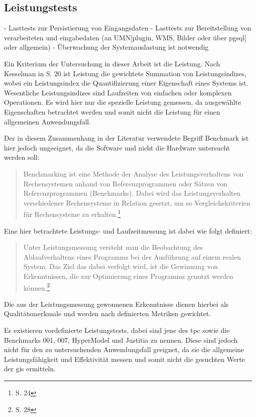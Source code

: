 \subsection{Leistungstests}
\label{Leistungstests}

- Lasttests zur Persistierung von Eingangsdaten
- Lasttests zur Bereitstellung von verarbeiteten und eingabedaten (an UMN[plugin, WMS, Bilder oder über pgsql] oder allgemein)
- Überwachung der Systemauslastung ist notwendig

Ein Kriterium der Untersuchung in dieser Arbeit ist die Leistung.
Nach Kesselman in \cite{book:Leistungsanalyse} S. 20 ist Leistung die gewichtete Summation von Leistungsindizes, wobei ein Leistungsindex die Quantifizierung einer Eigenschaft eines Systems ist.
Wesentliche Leistungsindizes sind Laufzeiten von einfachen oder komplexen Operationen.
Es wird hier nur die spezielle Leistung gemessen, da ausgewählte Eigenschaften betrachtet werden und somit nicht die Leistung für einen allgemeinen Anwendungsfall.

Der in diesem Zusammenhang in der Literatur verwendete Begriff Benchmark ist hier jedoch ungeeignet, da die Software und nicht die Hardware untersucht werden soll:
\begin {quote}
Benchmarking ist eine Methode der Analyse des Leistungsverhaltens von Rechensystemen anhand von Referenzprogrammen oder Sätzen von Referenzprogrammen (Benchmarks). Dabei wird das Leistungsverhalten verschiedener Rechensysteme in Relation gesetzt, um so Vergleichskriterien  für Rechensysteme zu erhalten.\footnote{\cite{book:Leistungsanalyse} S. 24}
\end{quote}
Eine hier betrachtete Leistungs- und Laufzeitmessung ist dabei wie folgt definiert:
\begin {quote}
Unter Leistungsmessung versteht man die Beobachtung des Ablaufverhaltens eines Programms bei der Ausführung auf einem realen System. Das Ziel das dabei verfolgt wird, ist die Gewinnung von Erkenntnissen, die zur Optimierung eines Programms genutzt werden können.\footnote{\cite{book:Leistungsanalyse} S. 28}
\end{quote}
Die aus der Leistungsmessung gewonnenen Erkenntnisse dienen hierbei als Qualitätsmerkmale und werden nach definierten Metriken gewichtet.

Es existieren vordefinierte Leistungstests, dabei sind jene des \Gls{tpc} sowie die Benchmarks 001, 007, HyperModel und Justitia zu nennen.
Diese sind jedoch nicht für den zu untersuchenden Anwendungsfall geeignet, da sie die allgemeine Leistungsfähigkeit und Effektivität messen und somit nicht die gesuchten Werte der \Gls{gis} ermitteln.